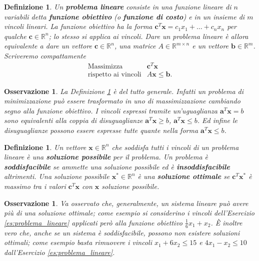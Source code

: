 \documentclass[italian, 12pt, reqno]{article}
\theoremstyle{myteo}
\newtheorem{definition}[theorem]{Definizione}
\newtheorem{remark}[theorem]{Osservazione}
\numberwithin{equation}{section}
\begin{document}
\begin{definition}
  \label{def:problema_lineare}
  Un \textbf{problema lineare} consiste in una funzione lineare di \(n\) variabili detta \textbf{funzione obiettivo} (o \textbf{funzione di costo}) e in un insieme di \(m\) vincoli lineari.
  La funzione obiettivo ha la forma \(\mathbf{c}^T\mathbf{x} = c_1x_1+\ldots+c_nx_n\) per qualche \(\mathbf{c}\in\mathbb{R}^n\); lo stesso si applica ai vincoli.
  Dare un problema lineare è allora equivalente a dare un vettore \(\mathbf{c}\in\mathbb{R}^n\), una matrice \(A\in\mathbb{R}^{m\times n}\) e un vettore \(\mathbf{b}\in\mathbb{R}^m\).
  Scriveremo compattamente
  \begin{equation*}
    \begin{array}{ll}
      \text{Massimizza} & \mathbf{c}^T\mathbf{x}\\
      \text{rispetto ai vincoli} & A\mathbf{x}\leq\mathbf{b}.
    \end{array}
  \end{equation*}
\end{definition}

\begin{remark}
  \label{oss:definizione_generale}
  La Definizione \ref{def:problema_lineare} è del tutto generale.
  Infatti un problema di minimizzazione può essere trasformato in uno di massimizzazione cambiando segno alla funzione obiettivo.
  I vincoli espressi tramite un'uguaglianza \(\mathbf{a}^T\mathbf{x}=b\) sono equivalenti alla coppia di disuguaglianze \(\mathbf{a}^T\mathbf{x}\geq b\), \(\mathbf{a}^T\mathbf{x}\leq b\).
  Ed infine le disuguaglianze possono essere espresse tutte quante nella forma \(\mathbf{a}^T\mathbf{x}\leq b\).
\end{remark}

\begin{definition}
  \label{def:soluzioni}
  Un vettore \(\mathbf{x}\in\mathbb{R}^n\) che soddisfa tutti i vincoli di un problema lineare è una \textbf{soluzione possibile} per il problema.
  Un problema è \textbf{soddisfacibile} se ammette una soluzione possibile ed è \textbf{insoddisfacibile} altrimenti. Una soluzione possibile \(\mathbf{x}^*\in\mathbb{R}^n\) è una \textbf{soluzione ottimale} se \(\mathbf{c}^T\mathbf{x}^*\) è massimo tra i valori \(\mathbf{c}^T\mathbf{x}\) con \(\mathbf{x}\) soluzione possibile.
\end{definition}

\begin{remark}
  \label{oss:soluzioni_ottimali_illimitate}
  Va osservato che, generalmente, un sistema lineare può avere più di una soluzione ottimale; come esempio si considerino i vincoli dell'Esercizio \ref{es:problema_lineare} applicati però alla funzione obiettivo \(\frac{1}{6}x_1+x_2\).
  È inoltre vero che, anche se un sistema è soddisfacibile, possono non esistere soluzioni ottimali; come esempio basta rimuovere i vincoli \(x_1+6x_2\leq15\) e \(4x_1-x_2\leq10\) dall'Esercizio \ref{es:problema_lineare}.
\end{remark}
\end{document}
